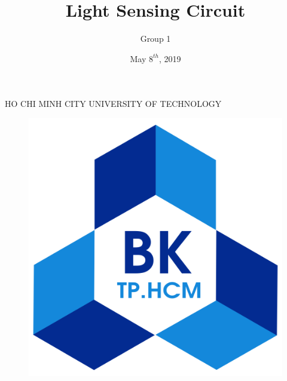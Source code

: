\documentclass[12pt]{extarticle}
\title{Light Sensing Circuit}
\author{Group 1}
\date{May $8^{th}$, 2019}
\newcommand{\<}{\langle}
\renewcommand{\>}{\rangle}
\theoremstyle{definition}
\begin{document}

\begin{titlepage} %
	\newcommand{\HRule}{\rule{\linewidth}{0.5mm}} %
	
	\center %
	
	
	\textsc{\LARGE HO CHI MINH CITY UNIVERSITY OF TECHNOLOGY}\\[0.25cm] %

	\begin{figure}[ht]
		\begin{center}
			
			\includegraphics[scale=0.12]{logobk.png}\\
	
		\end{center}
		

\end{figure}
\end{titlepage}
\end{document}
